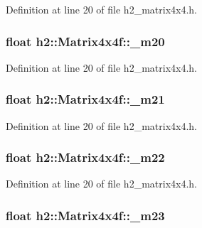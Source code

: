 Definition at line 20 of file h2\-\_\-matrix4x4.\-h.

\hypertarget{classh2_1_1_matrix4x4f_aa82b53d10e7f16fae05855364d07b2eb}{
\subsubsection[{\-\_\-m20}]{\setlength{\rightskip}{0pt plus 5cm}float h2\-::\-Matrix4x4f\-::\-\_\-m20}}\label{classh2_1_1_matrix4x4f_aa82b53d10e7f16fae05855364d07b2eb}


Definition at line 20 of file h2\-\_\-matrix4x4.\-h.

\hypertarget{classh2_1_1_matrix4x4f_ad44fa22dcc28750f515ad6adabbc5d70}{
\subsubsection[{\-\_\-m21}]{\setlength{\rightskip}{0pt plus 5cm}float h2\-::\-Matrix4x4f\-::\-\_\-m21}}\label{classh2_1_1_matrix4x4f_ad44fa22dcc28750f515ad6adabbc5d70}


Definition at line 20 of file h2\-\_\-matrix4x4.\-h.

\hypertarget{classh2_1_1_matrix4x4f_a3981f6ff58eb2222562a8b8dffe7f512}{
\subsubsection[{\-\_\-m22}]{\setlength{\rightskip}{0pt plus 5cm}float h2\-::\-Matrix4x4f\-::\-\_\-m22}}\label{classh2_1_1_matrix4x4f_a3981f6ff58eb2222562a8b8dffe7f512}


Definition at line 20 of file h2\-\_\-matrix4x4.\-h.

\hypertarget{classh2_1_1_matrix4x4f_abe26b63fed9bbb47dbbf13dc6f8f1914}{
\subsubsection[{\-\_\-m23}]{\setlength{\rightskip}{0pt plus 5cm}float h2\-::\-Matrix4x4f\-::\-\_\-m23}}\label{classh2_1_1_matrix4x4f_abe26b63fed9bbb47dbbf13dc6f8f1914}


